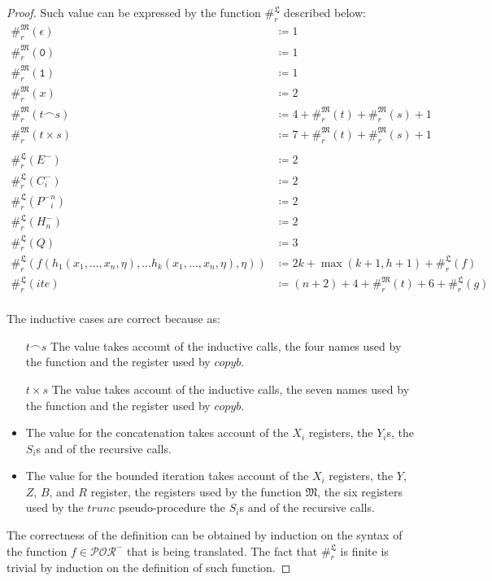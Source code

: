\documentclass[10pt]{amsart}
\newcommand{\POR}{\mathcal{POR}}
\newcommand{\conc}{\frown}
\newcommand{\zero}{\mathtt{0}}
\newcommand{\one}{\mathtt{1}}
\newcommand{\vone}{x}
\newcommand{\LL}{\mathfrak L}
\newcommand{\MM}{\mathfrak M}
\begin{document}
\begin{proof}
Such value can be expressed by the function $\#_r^\LL$ described below:
\begin{align*}
\#_r^\MM(\epsilon)&\coloneqq 1\\
\#_r^\MM(\zero)&\coloneqq 1\\
\#_r^\MM(\one)&\coloneqq 1\\
\#_r^\MM(\vone)&\coloneqq 2\\
\#_r^\MM(t \conc s)&\coloneqq 4+\#_r^\MM(t)+\#_r^\MM(s)+1\\
\#_r^\MM(t \times s)&\coloneqq 7+\#_r^\MM(t)+\#_r^\MM(s)+1\\\\
\#_r^\LL(E^-)&\coloneqq 2\\
\#_r^\LL(C_i^-)&\coloneqq 2\\
\#_r^\LL({P^-}_i^n)&\coloneqq 2\\
\#_r^\LL(H^-_n)&\coloneqq 2\\
\#_r^\LL(Q)&\coloneqq 3\\
\#_r^\LL(f(h_1(\vone_1,\ldots, \vone_n, \eta), \ldots h_k(\vone_1,\ldots, \vone_n, \eta), \eta))&\coloneqq 2k+\max(k+1, h+1)+\#_r^\LL(f)\\
\#_r^\LL(ite)&\coloneqq (n+2)+4+ \#_r^\MM(t)+6+\#_r^\LL(g)\\
\end{align*}

The inductive cases are correct because as:

\begin{itemize}
\item[$t\conc s$] The value takes account of the inductive calls, the four names used by the function and the register used by $copyb$.
\item[$t\times s$] The value takes account of the inductive calls, the seven names used by the function and the register used by $copyb$.
\item The value for the concatenation takes account of the $X_i$ registers, the $Y_i$s, the $S_i$s and of the recursive calls.
\item The value for the bounded iteration takes account of the $X_i$ registers, the $Y$, $Z$, $B$, and $R$ register, the registers used by the function $\MM$, the six registers used by the $trunc$ pseudo-procedure the $S_i$s and of the recursive calls.
\end{itemize}

The correctness of the definition can be obtained by induction on the syntax of the function $f\in\POR^-$ that is being translated. The fact that $\#_r^\LL$ is finite is trivial by induction on the definition of such function.
\end{proof}
\end{document}
